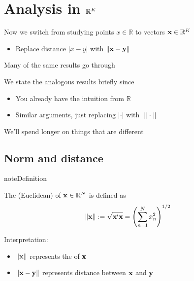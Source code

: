 \documentclass[letterpaper,10pt,english]{jupyterBook}
\begin{document}
\section{Analysis in \protect\(\mathbb{R}^K\protect\)}
\label{\detokenize{04.basic_analysis:analysis-in-mathbb-r-k}}
\sphinxAtStartPar
Now we switch from studying points \(x \in \mathbb{R}\) to vectors
\({\bf x} \in \mathbb{R}^K\)
\begin{itemize}
\item {} 
\sphinxAtStartPar
Replace distance \(|x - y|\) with \(\| {\bf x} - {\bf y} \|\)

\end{itemize}

\sphinxAtStartPar
Many of the same results go through 

\sphinxAtStartPar
We state the analogous results briefly since
\begin{itemize}
\item {} 
\sphinxAtStartPar
You already have the intuition from \(\mathbb{R}\)

\item {} 
\sphinxAtStartPar
Similar arguments, just replacing \(|\cdot|\) with \(\| \cdot \|\)

\end{itemize}

\sphinxAtStartPar
We’ll spend longer on things that are different


\subsection{Norm and distance}
\label{\detokenize{04.basic_analysis:norm-and-distance}}
\begin{sphinxadmonition}{note}{Definition}

\sphinxAtStartPar
The (Euclidean)  of \({\bf x} \in \mathbb{R}^N\) is defined as
\begin{equation*}
\begin{split}
\| {\bf x} \| 
:= \sqrt{{\bf x}' {\bf x} } 
= \left( \sum_{n=1}^N x_n^2 \right)^{1/2}
\end{split}
\end{equation*}\end{sphinxadmonition}

\sphinxAtStartPar
Interpretation:
\begin{itemize}
\item {} 
\sphinxAtStartPar
\(\| {\bf x} \|\) represents the  of \({\bf x}\)

\item {} 
\sphinxAtStartPar
\(\| {\bf x} - {\bf y} \|\) represents distance between \({\bf x}\) and \({\bf y}\)

\end{itemize}
\end{document}
